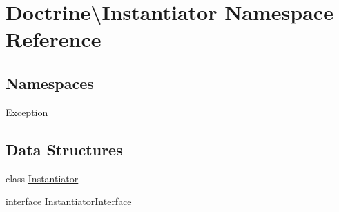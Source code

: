 \hypertarget{namespace_doctrine_1_1_instantiator}{}\section{Doctrine\textbackslash{}Instantiator Namespace Reference}
\label{namespace_doctrine_1_1_instantiator}
\subsection*{Namespaces}
\begin{DoxyCompactItemize}
\item 
 \mbox{\hyperlink{namespace_doctrine_1_1_instantiator_1_1_exception}{Exception}}
\end{DoxyCompactItemize}
\subsection*{Data Structures}
\begin{DoxyCompactItemize}
\item 
class \mbox{\hyperlink{class_doctrine_1_1_instantiator_1_1_instantiator}{Instantiator}}
\item 
interface \mbox{\hyperlink{interface_doctrine_1_1_instantiator_1_1_instantiator_interface}{Instantiator\+Interface}}
\end{DoxyCompactItemize}

